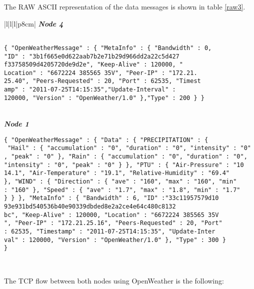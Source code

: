 The RAW \gls{ASCII} representation of the data messages is shown in table \ref{raw3}.

\begin{table}[H]
\centering
\begin{tabular}{|l|l|l|p{8cm}|}
\hline    
\textbf{\emph{Node 4}}\\
\hline
\begin{minipage}[t]{\linewidth}
\begin{verbatim}

{ "OpenWeatherMessage" : { "MetaInfo" : { "Bandwidth" : 0, 
"ID" : "3b1f665e0d622aab7b2e71b29d966dd2a22c5d427
f33758509d4205720de9d2e", "Keep-Alive" : 120000, "
Location" : "6672224 385565 35V", "Peer-IP" : "172.21.
25.40", "Peers-Requested" : 20, "Port" : 62535, "Timest
amp" : "2011-07-25T14:15:35","Update-Interval" : 
120000, "Version" : "OpenWeather/1.0" },"Type" : 200 } }

\end{verbatim}
\end{minipage} \\
\hline    
\textbf{\emph{Node 1}}\\
\hline
\begin{minipage}[t]{\linewidth}
\begin{verbatim}
{ "OpenWeatherMessage" : { "Data" : { "PRECIPITATION" : {
 "Hail" : { "accumulation" : "0", "duration" : "0", "intensity" : "0"
, "peak" : "0" }, "Rain" : { "accumulation" : "0", "duration" : "0",
"intensity" : "0", "peak" : "0" } }, "PTU" : { "Air-Pressure" : "10
14.1", "Air-Temperature" : "19.1", "Relative-Humidity" : "69.4" 
}, "WIND" : { "Direction" : { "ave" : "160", "max" : "160", "min"
: "160" }, "Speed" : { "ave" : "1.7", "max" : "1.8", "min" : "1.7"
} } }, "MetaInfo" : { "Bandwidth" : 6, "ID" :"33c11957579d10
93e931bd540536b40e90339dbded8e2a2ce4e64c480c8132
bc", "Keep-Alive" : 120000, "Location" : "6672224 385565 35V
", "Peer-IP" : "172.21.25.16", "Peers-Requested" : 20, "Port"
: 62535, "Timestamp" : "2011-07-25T14:15:35", "Update-Inter
val" : 120000, "Version" : "OpenWeather/1.0" }, "Type" : 300 }
}
\end{verbatim}
\end{minipage} \\
\hline
\end{tabular}
\caption{Data messages sent between \emph{Node 3} and \emph{Node 4}.}
\label{raw3}
\end{table}

The \gls{TCP} flow between both nodes using OpenWeather is the following:

